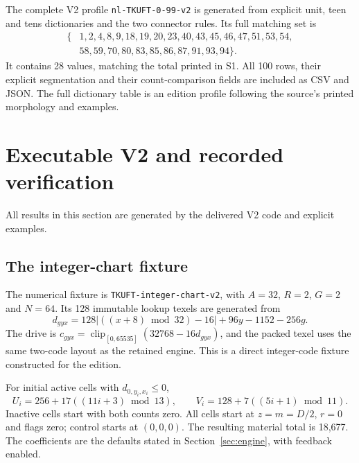 \documentclass[11pt,a4paper]{article}
\numberwithin{equation}{section}
\newcommand{\newsec}[1]{\clearpage\section{#1}}
\newcommand{\origin}[1]{{\sffamily\small\color{slate}#1}\par\vspace{3pt}}
\newcommand{\clip}{\operatorname{clip}}
\begin{document}
The complete V2 profile \texttt{nl-TKUFT-0-99-v2} is generated from explicit unit, teen and tens dictionaries and the two connector rules. Its full matching set is
\begin{equation*}
\begin{split}
\{&1,2,4,8,9,18,19,20,23,40,43,45,46,47,51,53,54,\\
&58,59,70,80,83,85,86,87,91,93,94\}.
\end{split}
\end{equation*}
It contains 28 values, matching the total printed in S1. All 100 rows, their explicit segmentation and their count-comparison fields are included as CSV and JSON. The full dictionary table is an edition profile following the source's printed morphology and examples.

\newsec{Executable V2 and recorded verification}
\label{sec:verification}
\origin{All results in this section are generated by the delivered V2 code and explicit examples.}

\subsection{The integer-chart fixture}
The numerical fixture is \texttt{TKUFT-integer-chart-v2}, with $A=32$, $R=2$, $G=2$ and $N=64$. Its 128 immutable lookup texels are generated from
\begin{equation}
d_{gyx}=128\left|((x+8)\bmod32)-16\right|+96y-1152-256g.
\end{equation}
The drive is $c_{gyx}=\clip_{[0,65535]}(32768-16d_{gyx})$, and the packed texel uses the same two-code layout as the retained engine. This is a direct integer-code fixture constructed for the edition.

For initial active cells with $d_{0,y_i,x_i}\le0$,
\begin{equation}
U_i=256+17((11i+3)\bmod13),\qquad
V_i=128+7((5i+1)\bmod11).
\end{equation}
Inactive cells start with both counts zero. All cells start at $z=m=D/2$, $r=0$ and flags zero; control starts at $(0,0,0)$. The resulting material total is 18,677. The coefficients are the defaults stated in Section~\ref{sec:engine}, with feedback enabled.
\end{document}
